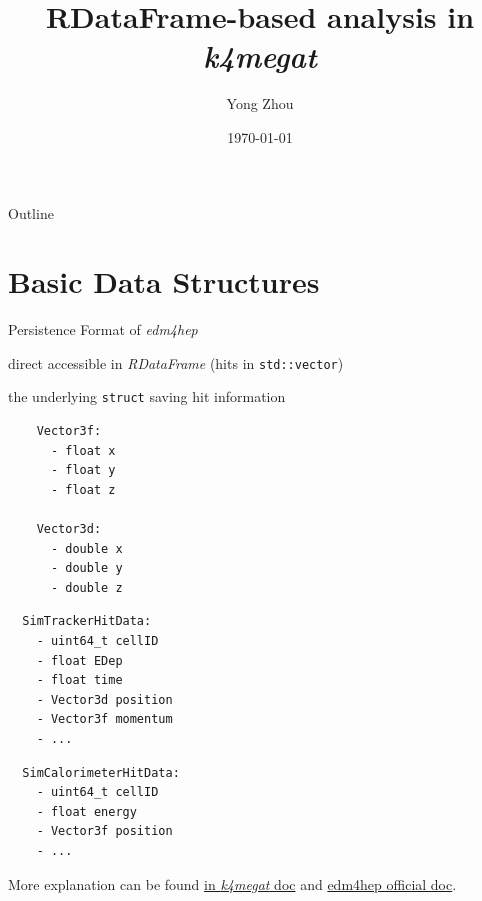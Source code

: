 \documentclass[11pt,t,aspectratio=169]{beamer}
\title{ RDataFrame-based analysis in \textit{k4megat}}
\author{Yong Zhou}
\institute{Megat Weekly Meeting}
\date{\today}
\begin{document}
\begin{frame}
    \titlepage
\end{frame}

\begin{frame}[c]{Outline}
    \tableofcontents
\end{frame}

\section{Basic Data Structures}
\begin{frame}[fragile,c]{Persistence Format of \textit{edm4hep}}
\begin{description}[l]
\item[Columnar layout] direct accessible in \textit{RDataFrame} (hits in \texttt{std::vector})
\item[\textit{xxxHitData}] the underlying \texttt{struct} saving hit information
\end{description}
\begin{multicols}{3}
\begin{verbatim}
    Vector3f:
      - float x
      - float y
      - float z

    Vector3d:
      - double x
      - double y
      - double z
\end{verbatim}
\columnbreak
\begin{verbatim}
  SimTrackerHitData:
    - uint64_t cellID
    - float EDep
    - float time
    - Vector3d position
    - Vector3f momentum
    - ...
\end{verbatim}

\columnbreak
\begin{verbatim}
  SimCalorimeterHitData:
    - uint64_t cellID
    - float energy
    - Vector3f position
    - ...
\end{verbatim}
\end{multicols}

More explanation can be
found
\href{https://k4megat-doc.readthedocs.io/en/latest/k4megat.html#what-is-saved-in-root-file}{in
\textit{k4megat} doc} and \href{https://github.com/key4hep/edm4hep/}{edm4hep official doc}.
\end{frame}
\end{document}
